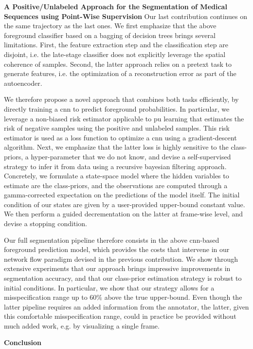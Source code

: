 \textbf{A Positive/Unlabeled Approach for the
Segmentation of Medical Sequences using
Point-Wise Supervision}
Our last contribution continues on the same trajectory as the last ones.
We first emphasize that the above foreground classifier based on a bagging of decision trees brings several limitations.
First, the feature extraction step and the classification step are disjoint, i.e. the late-stage classifier does not explicitly leverage the spatial coherence of samples.
Second, the latter approach relies on a pretext task to generate features, i.e. the optimization of a reconstruction error as part of the autoencoder.

We therefore propose a novel approach that combines both tasks efficiently, by directly training a \gls{cnn} to predict foreground probabilities.
In particular, we leverage a non-biased risk estimator applicable to \gls{pu} learning that estimates the risk of negative samples using the positive and unlabeled samples.
This risk estimator is used as a loss function to optimize a \gls{cnn} using a gradient-descent algorithm.
Next, we emphasize that the latter loss is highly sensitive to the class-priors, a hyper-parameter that we do not know, and devise a self-supervised strategy to infer it from data using a recursive bayesian filtering approach.
Concretely, we formulate a state-space model where the hidden variables to estimate are the class-priors, and the observations are computed through a gamma-corrected expectation on the predictions of the model itself.
The initial condition of our states are given by a user-provided upper-bound constant value.
We then perform a guided decrementation on the latter at frame-wise level, and devise a stopping condition.

Our full segmentation pipeline therefore consists in the above \gls{cnn}-based foreground prediction model, which provides the costs that intervene in our network flow paradigm devised in the previous contribution.
We show through extensive experiments that our approach brings impressive improvements in segmentation accuracy, and that our class-prior estimation strategy is robust to initial conditions.
In particular, we show that our strategy allows for a misspecification range up to $60\%$ above the true upper-bound.
Even though the latter pipeline requires an added information from the annotator, the latter, given this comfortable misspecification range, could in practice be provided without much added work, e.g. by visualizing a single frame.

\textbf{Conclusion}

